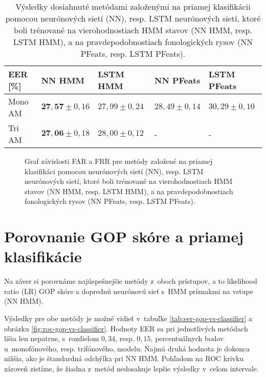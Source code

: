 \begin{table}[h!]
    \centering
    \begin{tabular}{@{}lllll@{}}
    \toprule
    EER {[}\%{]} & NN HMM        & LSTM HMM & NN PFeats          & LSTM PFeats \\ \midrule
    Mono AM      & $\bm{27{,}57} \pm 0{,}16$ & $27{,}99 \pm 0{,}24$  & $28{,}49 \pm 0{,}14$      & $30{,}29 \pm 0{,}10$           \\
    Tri AM       & $\bm{27{,}06} \pm 0{,}18$ & $28{,}00 \pm 0{,}12$        & -       & -           \\ \bottomrule
    \end{tabular}
    \label{tab:eer-classifiers}
    \caption{Výsledky dosiahnuté metódami založenými na priamej klasifikácii pomocou neurónových sietí (NN), resp. LSTM neurónových sietí, ktoré boli trénované na vierohodnostiach HMM stavov (NN HMM, resp. LSTM HMM), a na pravdepodobnostiach fonologických rysov (NN PFeats, resp. LSTM PFeats).}
\end{table}

\begin{figure}[h!]
    \centering
    
    \caption{Graf závislosti FAR a FRR pre metódy založené na priamej klasifikáci pomocou neurónových sietí (NN), resp. LSTM neurónových sietí, ktoré boli trénované na vierohodnostiach HMM stavov (NN HMM, resp. LSTM HMM), a na pravdepodobnostiach fonologických rysov (NN PFeats, resp. LSTM PFeats).} \label{fig:roc-classifiers}
\end{figure}


\section{Porovnanie GOP skóre a priamej klasifikácie}

Na záver si porovnáme najúspešnejšie metódy z~oboch prístupov, a to likelihood ratio (LR) GOP skóre a doprednú neurónovú sieť s~HMM príznakmi na vstupe (NN HMM).

Výsledky pre obe metódy je možné vidieť v~tabuľke \ref{tab:eer-gop-vs-classifier} a obrázku \ref{fig:roc-gop-vs-classifier}. Hodnoty EER sa pri jednotlivých metódach líšia len nepatrne, s~rozdielom $0{,}34$, resp. $0{,}15$, percentuálnych bodov u~monofónového, resp. trifónového, modelu. Najmä druhá hodnota je dokonca nižšia, ako je štandardná odchýlka pri NN HMM. Pohľadom na ROC krivku zároveň zistíme, že žiadna z~metód nedosahuje lepšie výsledky v~celom intervale.

